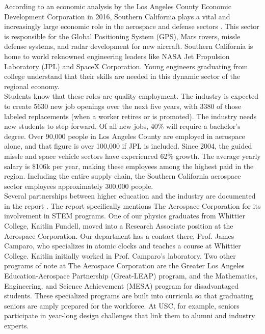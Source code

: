 \documentclass[../../../main.tex]{subfiles}
\begin{document}
\label{sec:naval_collaboration}

According to an economic analysis by the Los Angeles County Economic Development Corporation in 2016, Southern California plays a vital and increasingly large economic role in the aerospace and defense sectors \cite{laedc}.  This sector is responsible for the Global Positioning System (GPS), Mars rovers, missle defense systems, and radar development for new aircraft.  Southern California is home to world reknowned engineering leaders like NASA Jet Propulsion Laboratory (JPL) and SpaceX Corporation.  Young engineers graduating from college understand that their skills are needed in this dynamic sector of the regional economy.
\\
\vspace{0.25cm}
Students know that these roles are quality employment.  The industry is expected to create 5630 new job openings over the next five years, with 3380 of those labeled replacements (when a worker retires or is promoted).  The industry needs new students to step forward.  Of all new jobs, 40\% will require a bachelor's degree.  Over 90,000 people in Los Angeles County are employed in aerospace alone, and that figure is over 100,000 if JPL is included.  Since 2004, the guided missle and space vehicle sectors have experienced 62\% growth.  The average yearly salary is \$106k per year, making these employees among the highest paid in the region.  Including the entire supply chain, the Southern California aerospace sector employees approximately 300,000 people.
\\
\vspace{0.25cm}
Several partnerships between higher education and the industry are documented in the report \cite{laedc}.  The report specifically mentions The Aerospace Corporation for its involvement in STEM programs.  One of our physics graduates from Whittier College, Kaitlin Fundell, moved into a Research Associate position at the Aerospace Corporation.  Our department has a contact there, Prof. James Camparo, who specializes in atomic clocks and teaches a course at Whittier College.  Kaitlin initially worked in Prof. Camparo's laboratory.  Two other programs of note at The Aerospace Corporation are the Greater Los Angeles Education-Aerospace Partnership (Great-LEAP) program, and the Mathematics, Engineering, and Science Achievement (MESA) program for disadvantaged students.  These specialized programs are built into curricula so that graduating seniors are amply prepared for the workforce.  At USC, for example, seniors participate in year-long design challenges that link them to alumni and industry experts.
\end{document}
